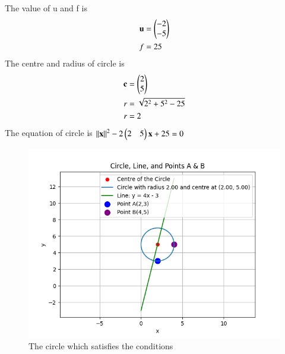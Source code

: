 \documentclass[journal]{IEEEtran}
\begin{document}
The value of u and f is 
\begin{align}
\mathbf{u}&=\begin{pmatrix}-2\\-5\end{pmatrix}\\
f&=25
\end{align}
The centre and radius of circle is
\begin{align}
\mathbf{c}&=\begin{pmatrix}2\\5\end{pmatrix}\\
r&=\sqrt{2^2+5^2-25}\\
r&=2
\end{align}
The equation of circle is $\left\lVert\mathbf{x}\right\rVert^2-2\begin{pmatrix}2 & 5\end{pmatrix}\mathbf{x}+25=0$
\begin{figure}[h!]
   \centering
   \includegraphics[width = 1\linewidth]{figs/fig.png}
   \caption{The circle which satisfies the conditions}
   \label{stemplot}
\end{figure}
\end{document}
